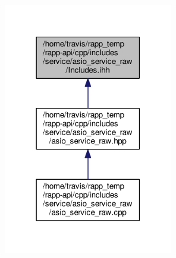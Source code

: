 \begin{figure}[H]
\begin{center}
\leavevmode
\includegraphics[width=210pt]{service_2asio__service__raw_2Includes_8ihh__dep__incl}
\end{center}
\end{figure}
